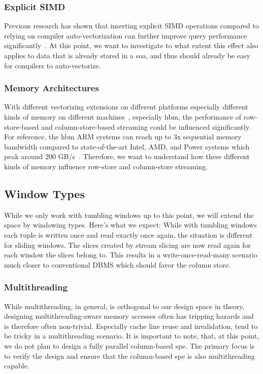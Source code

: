 \subsubsection{Explicit SIMD}

Previous research has shown that inserting explicit SIMD operations compared to relying on compiler auto-vectorization can further improve query performance significantly~\cite{DBLP:journals/pvldb/KerstenLKNPB18}.
At this point, we want to investigate to what extent this effect also applies to data that is already stored in a \ac{soa}, and thus should already be easy for compilers to auto-vectorize.

\subsubsection{Memory Architectures}

With different vectorizing extensions on different platforms especially different kinds of memory on different machines~\cite[]{bollmeier2021processor}, especially \ac{hbm}, the performance of row-store-based and column-store-based streaming could be influenced significantly.
For reference, the \ac{hbm} ARM systems can reach up to 3x sequential memory bandwidth compared to state-of-the-art Intel, AMD, and Power systems which peak around 200 GB/s~\cite[]{bollmeier2021processor}.
Therefore, we want to understand how these different kinds of memory influence row-store and column-store streaming.

\subsection{Window Types}

While we only work with tumbling windows up to this point, we will extend the space by windowing types.
Here's what we expect: While with tumbling windows each tuple is written once and read exactly once again, the situation is different for sliding windows. 
The slices created by stream slicing are now read again for each window the slices belong to.
This results in a write-once-read-many scenario much closer to conventional DBMS which should favor the column store.

\subsubsection{Multithreading}

While multithreading, in general, is orthogonal to our design space in theory, designing multithreading-aware memory accesses often has tripping hazards and is therefore often non-trivial.
Especially cache line reuse and invalidation, tend to be tricky in a multithreading scenario.
It is important to note, that, at this point, we do not plan to design a fully parallel column-based \ac{spe}.
The primary focus is to verify the design and ensure that the column-based \ac{spe} is also multithreading capable.

